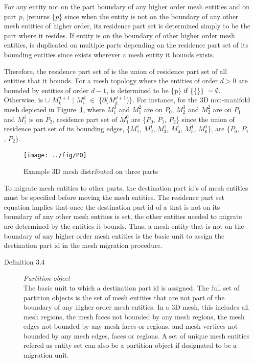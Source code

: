 For any entity \Mdi\blk not on the part boundary of any higher order mesh entities and on part
$p$, \RP$[$\Mdi\Rs\blk returns \{$p$\} since when the entity is not on the boundary of any
other mesh entities of higher order, its residence part set is determined simply to be the part where it resides.
If entity \Mdi\blk is on the boundary of other higher order mesh entities, \Mdi\blk is duplicated on multiple parts depending on the residence part set of its bounding entities since \Mdib exists wherever a mesh entity it bounds exists.

Therefore, the residence part set of \Mdi\blk is the union
of residence part set of all entities that it bounds. For a mesh topology
where the entities of order $d>0$ are 
bounded by entities of order $d-1$, \RP\Ls\Mdi\Rs\blk is determined to be
\{p\} if \{\Mdi\{\Mdpok\}\} $= \emptyset$. Otherwise, \RP\Ls\Mdi\Rs\blk is $\cup$ \RP\Ls$M^{d+1}_k$ $\mid$
$M^d_i$ $\in$ \{$\partial$($M^{d+1}_k$)\}\Rs. For instance, for the
3D non-manifold mesh depicted in Figure~\ref{pmesh3procs}, where $M^3_1$ and $M^2_1$
are on $P_0$, $M^3_2$ and $M^2_2$ are on $P_1$ and $M^1_1$ is on $P_2$, residence part set of $M^0_1$ are \{$P_0$, $P_1$, $P_2$\} since the union of residence part set of its bounding
edges, \{$M^1_1$, $M^1_2$, $M^1_3$, $M^1_4$, $M^1_5$, $M^1_6$\}, are \{$P_0$, $P_1$,
$P_2$\}. 

\begin{figure}
\centering
\texttt{[image: ../fig/PO]}
\caption{Example 3D mesh distributed on three parts}
\label{pmesh3procs}  
\end{figure}

To migrate mesh entities to other parts, the destination part id's of
mesh entities must be specified before moving the mesh
entities. The residence part set equation implies that once the destination
part id of a \Mdi\blk that is not on its boundary of any other
mesh entities is set, the other entities needed to migrate are determined by
the entities it bounds. Thus, a mesh entity that is not on the boundary of any higher order mesh entities is the basic
unit to assign the destination part id in the mesh migration procedure.
 
\begin{description}
\item[Definition 3.4] \emph{Partition object}\\
The basic unit to which a destination part id is assigned. The full set of partition objects is
the set of mesh entities that are not part of the boundary of any higher order mesh
entities. In a 3D mesh, this includes all mesh regions, the mesh faces not bounded
by any mesh regions, the mesh edges not bounded by any mesh faces or regions, and mesh vertices not
bounded by any mesh edges, faces or regions. A set of unique mesh entities refered as entity set can also be a partition object if designated to be a migration unit.
\end{description}

